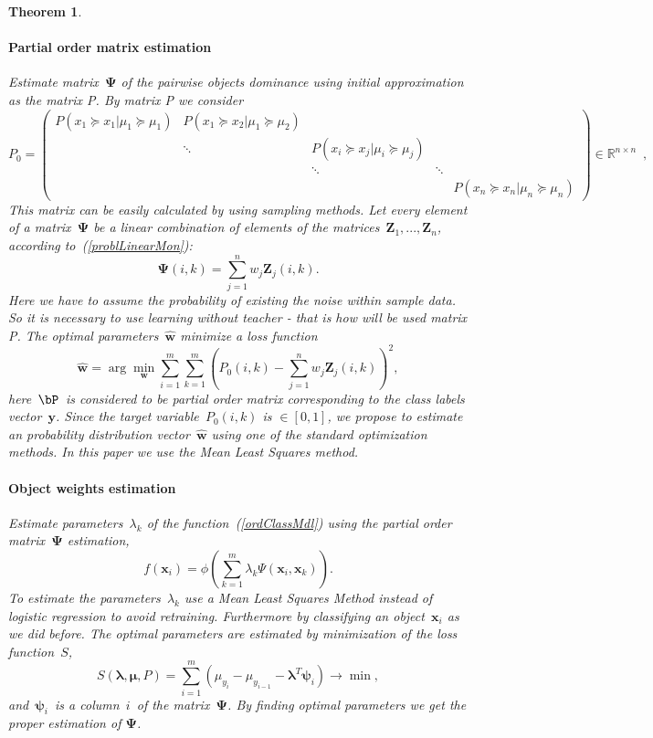 \documentclass[12pt,preprint]{elsarticle}
\newcommand{\blambda}{\boldsymbol{\lambda}}
\newcommand{\bx}{\mathbf{x}}
\newcommand{\by}{\mathbf{y}}
\newcommand{\bw}{\mathbf{w}}
\newcommand{\bZ}{\mathbf{Z}}
\newcommand{\bPsi}{\boldsymbol{\Psi}}
\newcommand{\bpsi}{\boldsymbol{\psi}}
\newtheorem{Theorem}{Theorem}
\begin{document}
\begin{Theorem}
\paragraph{Partial order matrix estimation}
Estimate matrix~$\bPsi$ of the pairwise objects dominance using initial approximation as the matrix P. By matrix P we consider
$$P_0 = \begin{pmatrix} P(x_1 \succeq x_1 | \mu_1 \succeq \mu_1) & P(x_1 \succeq x_2 | \mu_1 \succeq \mu_2) &                       &                       &    \\
  & \ddots  & P(x_i \succeq x_j | \mu_i \succeq \mu_j)                    &                       &    \\
  &    & \ddots & \ddots &    \\
  &    &                       &                     & P(x_n \succeq x_n | \mu_n \succeq \mu_n)\end{pmatrix}
 \in \mathbb{R}^{n \times n}\enspace,
$$
This matrix can be easily calculated by using sampling methods.
Let every element of a matrix~$\bPsi$ be a linear combination of elements of the matrices~$\bZ_1,...,\bZ_n$, according to~(\ref{problLinearMon}):
\[
\bPsi(i,k)=\sum\limits_{j=1}^n w_j\bZ_j(i,k).
\]
Here we have to assume the probability of existing the noise within sample data. So it is necessary to use learning without teacher - that is how will be used matrix P.
The optimal parameters~$\hat{\bw}$ minimize a loss function
\[
\hat{\bw} = \arg\min\limits_{\bw}\sum\limits_{i=1}^m\sum\limits_{k=1}^m\left(P_0(i,k) - \sum\limits_{j=1}^n w_j\bZ_j(i,k)\right)^2,
\]
here~$\bP$~is considered to be partial order matrix corresponding to the class labels vector~$\by$.
Since the target variable~$P_0(i,k)$ is $\in[0,1]$, we propose to estimate an probability distribution vector~$\hat{\bw}$ using one of the standard optimization methods. In this paper we use the Mean Least Squares method.



\paragraph{Object weights estimation}
Estimate parameters~$\lambda_k$ of the function~(\ref{ordClassMdl}) using the partial order matrix~$\bPsi$ estimation,
\[
f(\bx_i) = \phi\left(\sum\limits_{k=1}^m \lambda_{k} \Psi(\bx_i, \bx_k)\right).
\]
To estimate the parameters~$\lambda_k$ use a Mean Least Squares Method instead of logistic regression to avoid retraining. Furthermore by classifying an object~$\bx_i$ as we did before. The optimal parameters are estimated by minimization of the loss function~$S$,
\[
S(\blambda, \boldsymbol{\mu}, P)=\sum\limits_{i=1}^m \left(\mu_{y_i}- \mu_{y_{i-1}} - \blambda^T \bpsi_i\right)\rightarrow \min,
\]
and~$\bpsi_i$~is a column~$i$~of the matrix~$\bPsi$.
By finding optimal parameters we get the proper estimation of $\bPsi$.



\end{Theorem}
\end{document}
